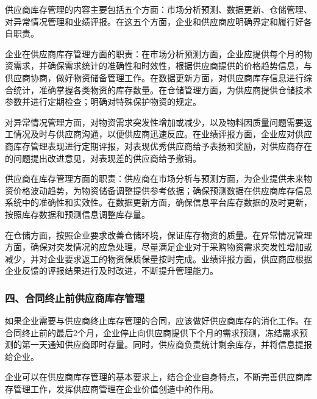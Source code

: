     供应商库存管理的内容主要包括五个方面：市场分析预测、数据更新、仓储管理、对异常情况管理和业绩评报。在这五个方面，企业和供应商应明确界定和履行好各自职责。

    企业在供应商库存管理方面的职责：在市场分析预测方面，企业应提供每个月的物资需求，并确保需求统计的准确性和时效性，根据供应商提供的价格趋势信息，与供应商协商，做好物资储备管理工作。在数据更新方面，对供应商库存信息进行综合统计，准确掌握各类物资的库存数量。在仓储管理方面，为供应商提供仓储技术参数并进行定期检查；明确对特殊保护物资的规定。

    对异常情况管理方面，对物资需求突发性增加或减少，以及物料因质量问题需要返工情况及时与供应商沟通，以便供应商迅速反应。在业绩评报方面，企业应对供应商库存管理表现进行定期评报，对表现优秀供应商给予表扬和奖励，对供应商存在的问题提出改进意见，对表现差的供应商给予撤销。

    供应商在库存管理方面的职责：供应商在市场分析与预测方面，为企业提供未来物资价格波动趋势，为物资储备调整提供参考依据；确保预测数据在供应商库存信息系统中的准确性和实效性。在数据更新方面，确保信息平台库存数据的及时更新，按照库存数据和预测信息调整库存量。

    在仓储方面，按照企业要求改善仓储环境，保证库存物资的质量。在异常情况管理方面，确保对突发情况的应急处理，尽量满足企业对于采购物资需求突发性增加或减少，并对企业要求返工的物资保质保量按时完成。业绩评报方面，供应商应根据企业反馈的评报结果进行及时改进，不断提升管理能力。

\subsubsection { 四、合同终止前供应商库存管理}

    如果企业需要与供应商终止库存管理的合同，应该做好供应商库存的消化工作。在合同终止前的最后2个月，企业停止向供应商提供下个月的需求预测，冻结需求预测的第一天通知供应商即时存量。同时，供应商负责统计剩余库存，并将信息提报给企业。

    企业可以在供应商库存管理的基本要求上，结合企业自身特点，不断完善供应商库存管理工作，发挥供应商管理在企业价值创造中的作用。

